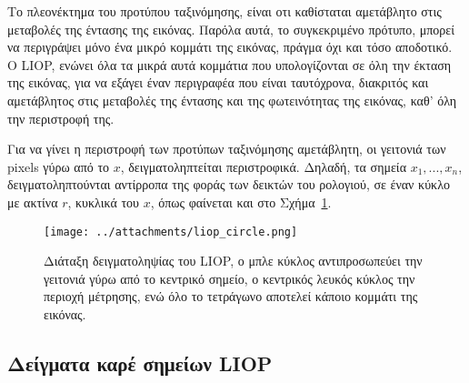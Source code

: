\par
Το πλεονέκτημα του προτύπου ταξινόμησης, είναι οτι καθίσταται αμετάβλητο στις μεταβολές της έντασης της εικόνας. Παρόλα αυτά, το συγκεκριμένο πρότυπο, μπορεί να περιγράψει μόνο ένα μικρό
κομμάτι της εικόνας, πράγμα όχι και τόσο αποδοτικό. Ο LIOP, ενώνει όλα τα μικρά αυτά κομμάτια που υπολογίζονται σε όλη την έκταση της εικόνας, για να εξάγει έναν περιγραφέα 
που είναι ταυτόχρονα, διακριτός και αμετάβλητος στις μεταβολές της έντασης και της φωτεινότητας της εικόνας, καθ' όλη την περιστροφή της.\par
Για να γίνει η περιστροφή των προτύπων ταξινόμησης αμετάβλητη, οι γειτονιά των pixels γύρω από το $x$, δειγματοληπτείται περιστροφικά.
Δηλαδή, τα σημεία $x_1,...,x_n$, δειγματοληπτούνται αντίρροπα της φοράς των δεικτών του ρολογιού, σε έναν κύκλο με ακτίνα $r$, κυκλικά του $x$,
όπως φαίνεται και στο Σχήμα~\ref{fig:liop_circle}.

\newpage

\begin{figure}[!ht]
\begin{minipage}[b]{1.0\linewidth}
\centering
\texttt{[image: ../attachments/liop\_circle.png]}
\end{minipage}
\caption{Διάταξη δειγματοληψίας του LIOP, ο μπλε κύκλος αντιπροσωπεύει την γειτονιά γύρω από το κεντρικό σημείο, ο κεντρικός λευκός κύκλος την περιοχή μέτρησης, ενώ όλο το τετράγωνο 
αποτελεί κάποιο κομμάτι της εικόνας.}
\label{fig:liop_circle}
\end{figure}




\newpage

\subsection{Δείγματα καρέ σημείων LIOP}

